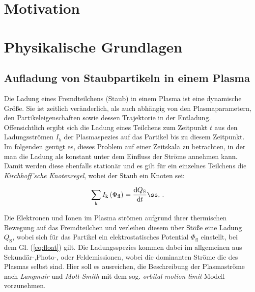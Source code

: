 \documentclass[numbers=noenddot,a4paper]{scrartcl}
\newcommand{\diff}{\textnormal{d}}
\newcommand{\ix}[1]{_\text{#1}}
\newcommand{\tilt}[1]{\textit{#1}}
\begin{document}
	\thispagestyle{empty}
	
	\newpage
	
	\tableofcontents
	
	\newpage
	
	\section{Motivation}\label{sec:einleitung}
	
	\newpage
	
	\section{Physikalische Grundlagen}\label{sec:physg}
	
		\subsection{Aufladung von Staubpartikeln in einem Plasma}\label{subsec:ströme}
		
			Die Ladung eines Fremdteilchens (Staub) in einem Plasma ist eine dynamische Größe. Sie ist zeitlich veränderlich, als auch abhängig von den Plasmaparametern, den Partikeleigenschaften sowie dessen Trajektorie in der Entladung. Offensichtlich ergibt sich die Ladung eines Teilchens zum Zeitpunkt $t$ aus den Ladungsströmen $I\ix{k}$ der Plasmaspezies auf das Partikel bis zu diesem Zeitpunkt. Im folgenden genügt es, dieses Problem auf einer Zeitskala zu betrachten, in der man die Ladung als konstant unter dem Einfluss der Ströme annehmen kann. Damit werden diese ebenfalls stationär und es gilt für ein einzelnes Teilchens die \tilt{Kirchhoff'sche Knotenregel}, wobei der Staub ein Knoten sei:
			
				\begin{align}
					\sum_{\text{k}} I\ix{k}\left(\Phi\ix{fl}\right)=\frac{\diff Q\ix{S}}{\diff t} ß,\, . \label{eq:float}
				\end{align}

		Die Elektronen und Ionen im Plasma strömen aufgrund ihrer thermischen Bewegung auf das Fremdteilchen und verleihen diesem über Stöße eine Ladung $Q\ix{S}$, wobei sich für das Partikel ein elektrostatisches Potential $\Phi\ix{fl}$ einstellt, bei dem Gl. (\ref{eq:float}) gilt. Die Ladungsspezies kommen dabei im allgemeinen aus Sekundär-,Photo-, oder Feldemissionen, wobei die dominanten Ströme die des Plasmas selbst sind. Hier soll es ausreichen, die Beschreibung der Plasmaströme nach  \tilt{Langmuir} und \tilt{Mott-Smith} mit dem sog. \tilt{orbital motion limit}-Modell \cite{Langmuir26} vorzunehmen. 
		
\end{document}
